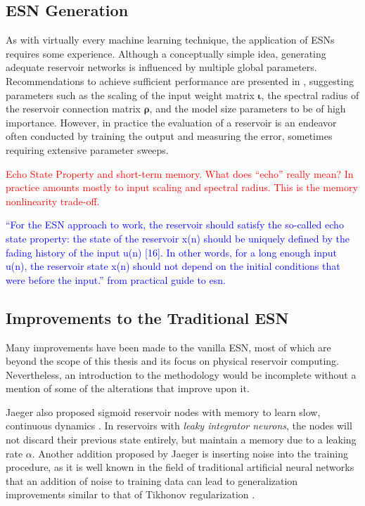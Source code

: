 \subsection{ESN Generation}

As with virtually every machine learning technique, the application of ESNs
requires some experience. Although a conceptually simple idea, generating
adequate reservoir networks is influenced by multiple global
parameters. Recommendations to achieve sufficient performance are presented in
\cite{montavon_practical_2012, jaeger_tutorial_2002}, suggesting parameters such
as the scaling of the input weight matrix $\boldsymbol{\iota}$, the spectral
radius of the reservoir connection matrix $\boldsymbol{\rho}$, and the model
size parameters to be of high importance. However, in practice the evaluation of
a reservoir is an endeavor often conducted by training the output and measuring
the error, sometimes requiring extensive parameter sweeps.

\textcolor{red}{
  Echo State Property and short-term memory. What does ``echo'' really mean? In
practice amounts mostly to input scaling and spectral radius. This is the memory
nonlinearity trade-off.
}

\textcolor{blue}{
  ``For the ESN approach to work, the reservoir should satisfy the so-called
echo state property: the state of the reservoir x(n) should be uniquely defined
by the fading history of the input u(n) [16]. In other words, for a long enough
input u(n), the reservoir state x(n) should not depend on the initial conditions
that were before the input.'' from practical guide to esn.
}

\subsection{Improvements to the Traditional ESN}

Many improvements have been made to the vanilla ESN, most of which are beyond
the scope of this thesis and its focus on physical reservoir
computing. Nevertheless, an introduction to the methodology would be incomplete
without a mention of some of the alterations that improve upon it.

Jaeger also proposed sigmoid reservoir nodes with memory to learn slow,
continuous dynamics \cite{jaeger_echo_2001}. In reservoirs with \textit{leaky
integrator neurons}, the nodes will not discard their previous state entirely,
but maintain a memory due to a leaking rate $\alpha$. Another addition proposed
by Jaeger is inserting noise into the training procedure, as it is well known in
the field of traditional artificial neural networks that an addition of noise to
training data can lead to generalization improvements similar to that of
Tikhonov regularization \cite{bishop_training_1995}.

